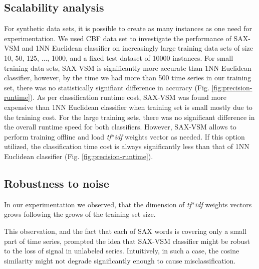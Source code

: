 \documentclass{llncs}
\begin{document}
\subsection{Scalability analysis}
For synthetic data sets, it is possible to create as many instances as one need for experimentation.
We used CBF data set \cite{cbf} to investigate the performance of SAX-VSM and 1NN Euclidean
classifier on increasingly large training data sets of size 10, 50, 125, ..., 1000, and a fixed test
dataset of 10000 instances. For small training data sets, SAX-VSM is significantly more accurate
than 1NN Euclidean classifier, however, by the time we had more than 500 time series in
our training set, there was no statistically signifiant difference in accuracy (Fig.
\ref{fig:precision-runtime}). 
As per classification runtime cost, SAX-VSM was found more expensive than 1NN Euclidean classifier
when training set is small mostly due to the training cost. For the large training sets, there was
no significant difference in the overall runtime speed for both classifiers.
However, SAX-VSM allows to perform training offline and load \textit{tf$\ast$idf} weights vector as
needed. If this option utilized, the classification time cost is always significantly less than that
of 1NN Euclidean classifier (Fig. \ref{fig:precision-runtime}).

\subsection{Robustness to noise}
In our experimentation we observed, that the dimension of \textit{tf$\ast$idf} weights vectors 
grows following the grows of the training set size. 

This observation, and the fact that each of SAX words is covering only a small part of time 
series, prompted the idea that SAX-VSM classifier might be robust to the loss of signal 
in unlabeled series. Intuitively, in such a case, the cosine similarity might not
degrade significantly enough to cause misclassification.
\end{document}
